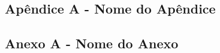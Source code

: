 \documentclass[
	12pt,				%
	oneside,   	        %
	a4paper,			%
	english,			%
	french,				%
	spanish,			%
	brazil,				%
	]{pacotes/abntex2}
\begin{document}





\begin{apendicesenv}

\section*{Apêndice A - Nome do Apêndice}

\end{apendicesenv}



\begin{anexosenv}

\section*{Anexo A - Nome do Anexo}
\end{anexosenv}
\end{document}
